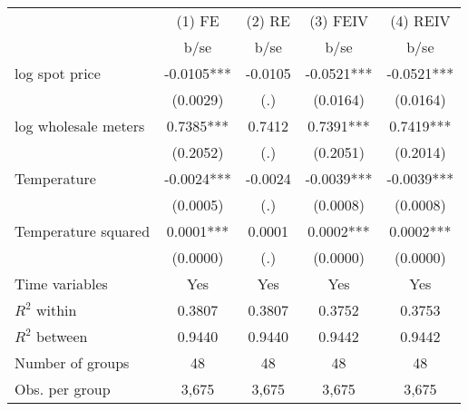 \begin{tabular}{lcccc}\toprule
                    &      (1) FE   &      (2) RE   &    (3) FEIV   &    (4) REIV   \\
                    &        b/se   &        b/se   &        b/se   &        b/se   \\
\midrule
log spot price      &     -0.0105***&     -0.0105   &     -0.0521***&     -0.0521***\\
                    &    (0.0029)   &         (.)   &    (0.0164)   &    (0.0164)   \\
log wholesale meters&      0.7385***&      0.7412   &      0.7391***&      0.7419***\\
                    &    (0.2052)   &         (.)   &    (0.2051)   &    (0.2014)   \\
Temperature         &     -0.0024***&     -0.0024   &     -0.0039***&     -0.0039***\\
                    &    (0.0005)   &         (.)   &    (0.0008)   &    (0.0008)   \\
Temperature squared &      0.0001***&      0.0001   &      0.0002***&      0.0002***\\
                    &    (0.0000)   &         (.)   &    (0.0000)   &    (0.0000)   \\
Time variables      &         Yes   &         Yes   &         Yes   &         Yes   \\
\midrule
\(R^2\) within      &      0.3807   &      0.3807   &      0.3752   &      0.3753   \\
\(R^2\) between     &      0.9440   &      0.9440   &      0.9442   &      0.9442   \\
Number of groups    &          48   &          48   &          48   &          48   \\
Obs. per group      &       3,675   &       3,675   &       3,675   &       3,675   \\
\bottomrule\end{tabular}
